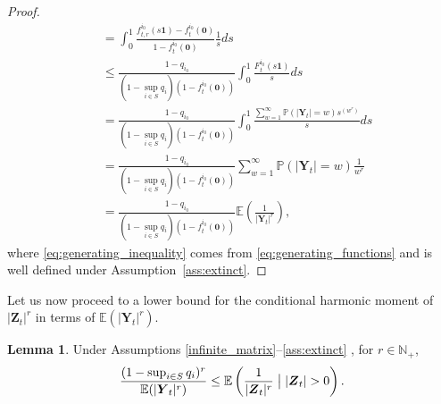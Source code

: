 \documentclass[preprint,3p,12pt]{elsarticle}
\theoremstyle{definition}
\newtheorem{lemma}{Lemma}
\newcommand{\assumptionsHS}{%
 \ref{infinite_matrix}--\ref{ass:extinct}
}
\begin{document}
\begin{proof}
\begin{align}
&=    \int_0^1 \frac{f_{t,r}^{i_0}(s\boldsymbol{1})-f_{t}^{i_0}(\boldsymbol{0})}{1-f_{t}^{i_0}(\boldsymbol{0})} \frac{1}{s}ds \nonumber \\
&\le \frac{1-q_{i_0}}{    (1-\sup_{i \in S}q_i)(1-f_{t}^{i_0}(\boldsymbol{0}))  } \int_0^1 \frac{F_t^{i_0}(s\boldsymbol{1})}{s} ds \label{eq:generating_inequality} \\
&= \frac{1-q_{i_0}}{    (1-\sup_{i \in S}q_i)(1-f_{t}^{i_0}(\boldsymbol{0}))  } \int_0^1 \frac{\sum_{w=1}^{\infty} \mathbb{P}(|\boldsymbol{Y}_t|=w) s^{(w^r)}}{s} ds \nonumber \\
&=\frac{1-q_{i_0}}{    (1-\sup_{i \in S}q_i)(1-f_{t}^{i_0}(\boldsymbol{0}))  }  \sum_{w=1}^{\infty} \mathbb{P}(|\boldsymbol{Y}_t|=w) \frac{1}{w^r} \nonumber \\
&=  \frac{1-q_{i_0}}{     (1-\sup_{i \in S}q_i)(1-f_{t}^{i_0}(\boldsymbol{0}))  }\mathbb{E}\left(\frac{1}{|\boldsymbol{Y}_t|^r}\right), \nonumber
 \end{align}
 where \eqref{eq:generating_inequality} comes from \eqref{eq:generating_functions} and is well defined under Assumption~\ref{ass:extinct}. 
\end{proof}
Let us now proceed to a lower bound for the conditional harmonic moment of $|\boldsymbol{Z}_t|^r$ in terms of $\mathbb{E}(|\boldsymbol{Y}_t|^r)$.
\begin{lemma}\label{z_and_y_lower}
Under Assumptions \assumptionsHS, for $r \in \mathbb{N}_+$,
       \begin{equation*}
       \frac{(1-\sup_{i \in S}q_i)^{r}}{\mathbb{E}(|\boldsymbol{Y}_t|^{r})} 
   \le\mathbb{E}\left(\frac{1}{|\boldsymbol{Z}_t|^{r}}\bigm| |\boldsymbol{Z}_{t}| >0\right).
    \end{equation*}
\end{lemma}
\end{document}

